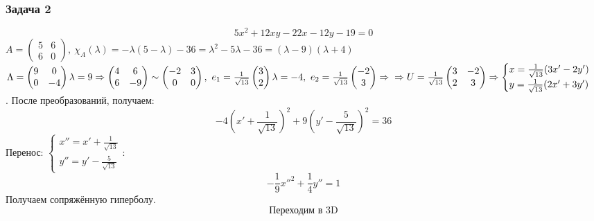 \documentclass[12pt, letterpaper, twoside]{article}
\begin{document}
\subsubsection*{Задача 2}
\[5x^2 + 12 xy - 22 x - 12 y - 19 = 0\]
$A = \begin{pmatrix}
    5 & 6\\
    6 & 0
\end{pmatrix},\ \chi_A(\lambda) = -\lambda(5 - \lambda) - 36 = \lambda^2 - 5\lambda - 36 = (\lambda - 9)(\lambda + 4)$\\
$\Lambda = \begin{pmatrix}
    9 & 0\\
    0 & -4
\end{pmatrix}\\
\lambda = 9\Rightarrow \begin{pmatrix}
    4 & 6\\
    6 & -9
\end{pmatrix}\sim \begin{pmatrix}
    -2 & 3\\
    0 & 0
\end{pmatrix},\ e_1 = \frac{1}{\sqrt{13}} \begin{pmatrix}
    3\\ 2
\end{pmatrix}\\
\lambda = -4,\ e_2 = \frac{1}{\sqrt{13}}\begin{pmatrix}
    -2\\ 3
\end{pmatrix}\Rightarrow\\
\Rightarrow U = \frac{1}{\sqrt{13}} \begin{pmatrix}
    3 & -2\\
    2 & 3
\end{pmatrix}\Rightarrow \begin{cases}
    x = \frac{1}{\sqrt{13}}(3x' - 2y')\\
    y = \frac{1}{\sqrt{13}}(2x' + 3y')
\end{cases}$. После преобразований, получаем:\\
\[-4(x' + \frac{1}{\sqrt{13}})^2 + 9(y' - \frac{5}{\sqrt{13}})^2 = 36\]
Перенос: $\begin{cases}
    x'' = x' + \frac{1}{\sqrt{13}}\\y'' = y' - \frac{5}{\sqrt{13}}
\end{cases}$:
\[-\frac{1}{9}x''^2 + \frac{1}{4} y'' = 1\]
Получаем сопряжённую гиперболу.\newpage
\[\text{Переходим в 3D}\]
\end{document}
